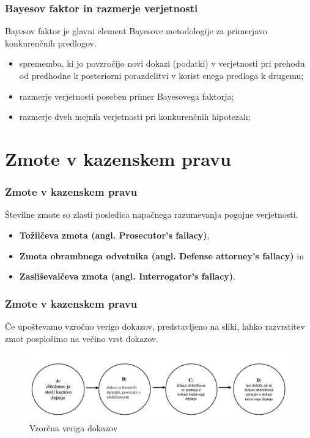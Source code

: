 \documentclass{beamer}
\begin{document}
\begin{frame}
    \frametitle{Bayesov faktor in razmerje verjetnosti}
    \begin{block}{Bayesov faktor je glavni element Bayesove metodologije za primerjavo konkurenčnih predlogov.}
        \begin{itemize}
            \item sprememba, ki jo povzročijo novi dokazi (podatki) v verjetnosti pri prehodu od predhodne k posteriorni porazdelitvi v korist enega predloga k drugemu;
            \item razmerje verjetnosti poseben primer Bayesovega faktorja;
            \item razmerje dveh mejnih verjetnosti pri konkurenčnih hipotezah;
        \end{itemize}
    \end{block}
\end{frame}

\section{Zmote v kazenskem pravu}
\begin{frame}
    \frametitle{Zmote v kazenskem pravu}
  Številne zmote so zlasti posledica napačnega razumevanja pogojne verjetnosti.
  \begin{itemize}
    \item \textbf{Tožilčeva zmota (angl. Prosecutor’s fallacy)},
    \item \textbf{Zmota obrambnega odvetnika (angl. Defense attorney's fallacy)} in 
    \item \textbf{Zasliševalčeva zmota (angl. Interrogator’s fallacy)}. \vspace{3mm}
  \end{itemize}
\end{frame}

\begin{frame}
    \frametitle{Zmote v kazenskem pravu}
    Če upoštevamo vzročno verigo dokazov, predstavljeno na sliki, lahko razvrstitev zmot posplošimo na večino vrst dokazov. 
    \begin{figure}[!ht]\label{fig:slika_3}
        \centering
        \includegraphics[scale=0.50]{slika_3.png}
        \caption{Vzorčna veriga dokazov}
    \end{figure}
\end{frame}
\end{document}
